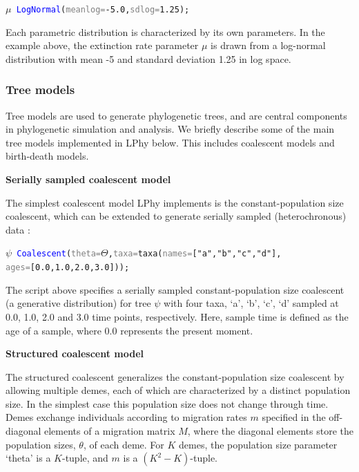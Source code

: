 \documentclass[10pt,letterpaper,table]{article}
\theoremstyle{definition}
\begin{document}
{\small
\begin{alltt}
    \textcolor{bluishgreen}{\(\mu\)} ~ \textcolor{blue}{LogNormal}(\textcolor{gray}{meanlog=}\textcolor{constant}{-5.0}, \textcolor{gray}{sdlog=}\textcolor{constant}{1.25});
\end{alltt}}

Each parametric distribution is characterized by its own parameters. 
In the example above, the extinction rate parameter $\mu$ is drawn from a log-normal distribution with mean -5 and standard deviation 1.25 in log space.

\subsubsection{Tree models}
\label{sec:treeprior}
Tree models are used to generate phylogenetic trees, and are central components in phylogenetic simulation and analysis. 
We briefly describe some of the main tree models implemented in LPhy below. 
This includes coalescent models and birth-death models.
\newline 

\textbf{Serially sampled coalescent model}

The simplest coalescent model LPhy implements is the constant-population size coalescent, which can be extended to generate serially sampled (heterochronous) data \cite{Rodrigo1999SerialCoalescent}:
{\small
  \begin{alltt}
    \textcolor{bluishgreen}{\(\psi\)} ~ \textcolor{blue}{Coalescent}(\textcolor{gray}{theta=}\textcolor{bluishgreen}{\(\Theta\)}, \textcolor{gray}{taxa=}\textcolor{generator}{taxa}(\textcolor{gray}{names=}[\textcolor{constant}{"a"}, \textcolor{constant}{"b"}, \textcolor{constant}{"c"}, \textcolor{constant}{"d"}], 
      \textcolor{gray}{ages=}[\textcolor{constant}{0.0}, \textcolor{constant}{1.0}, \textcolor{constant}{2.0}, \textcolor{constant}{3.0}]));
  \end{alltt}
}

The script above specifies a serially sampled constant-population size coalescent (a generative distribution) for tree $\psi$ with four taxa, `a', `b', `c', `d' sampled at 0.0, 1.0, 2.0 and 3.0 time points, respectively. 
Here, sample time is defined as the age of a sample, where 0.0 represents the present moment.
\newline

\textbf{Structured coalescent model}

The structured coalescent \cite{hudson1990oxford, notohara1990coalescent} generalizes the constant-population size coalescent \cite{kingman82} by allowing multiple demes, each of which are characterized by a distinct population size. 
In the simplest case this population size does not change through time.
Demes exchange individuals according to migration rates $m$ specified in the off-diagonal elements of a migration matrix $M$, where the diagonal elements store the population sizes, $\theta$, of each deme.
For $K$ demes, the population size parameter `theta' is a $K$-tuple, and $m$ is a $(K^2-K)$-tuple.
\end{document}
